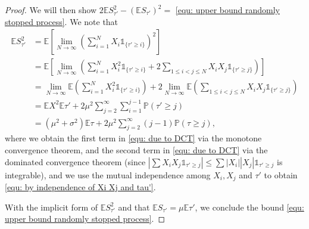 \documentclass[ECP]{ejpecp} %
\newcommand{\lpar}{\left(}
\newcommand{\rpar}{\right)}
\newcommand{\lbr}{\left[}
\newcommand{\rbr}{\right]}
\newcommand{\pro}{\mathbb{P}}
\newcommand{\E}{\mathbb{E}}
\newcommand{\one}{\mathds{1}}
\begin{document}
\begin{proof}
    We will then show $2 \E S^2_{\tau'} - (\E S_{\tau'})^2 =$ \eqref{equ: upper bound randomly stopped process}. We note that
    \begin{align}
        \E S^2_{\tau'} & = \E \lbr \lim\limits_{N\rightarrow\infty} \lpar \sum \limits_{i=1}^N X_i \one_{\{\tau'\geq i\}}\rpar^2 \rbr \nonumber\\
        & = \E \lbr \lim\limits_{N\rightarrow\infty} \lpar \sum\limits_{i=1}^N X_i^2 \one_{\{\tau'\geq i\}}+2\sum\limits_{1\leq i<j\leq N} X_i X_j \one_{\{\tau'\geq j\}} \rpar \rbr\nonumber \\
        & =   \lim\limits_{N\rightarrow\infty}  \E\lpar \sum\limits_{i=1}^N X_i^2 \one_{\{\tau'\geq i\}}\rpar + 2\lim\limits_{N\rightarrow\infty} \E \lpar \sum\limits_{1\leq i<j\leq N} X_i X_j \one_{\{\tau'\geq j\}} \rpar \label{equ: due to DCT}\\
        & = \E X^2 \E \tau' + 2\mu^2  \sum\limits_{j =2}^\infty \sum\limits_{i=1}^{j-1} \pro(\tau' \geq j)  \label{equ: by independence of Xi Xj and tau'}\\
        & = (\mu^2+\sigma^2) \E \tau + 2\mu^2 \sum\limits_{j=2}^\infty (j-1) \pro(\tau \geq j),\nonumber 
    \end{align}
    where we obtain the first term in \eqref{equ: due to DCT} via the monotone convergence theorem, and the second term in \eqref{equ: due to DCT} via the dominated convergence theorem (since $|\sum X_i X_j \one_{\tau' \geq j}| \leq \sum |X_i| |X_j| \one_{\tau' \geq j}$ is integrable), and we use the mutual independence among $X_i, X_j$ and $\tau'$ to obtain \eqref{equ: by independence of Xi Xj and tau'}. 

    With the implicit form of $\E S^2_{\tau'}$ and that $\E S_{\tau'}= \mu \E \tau'$, we conclude the bound \eqref{equ: upper bound randomly stopped process}.
\end{proof}
\end{document}
